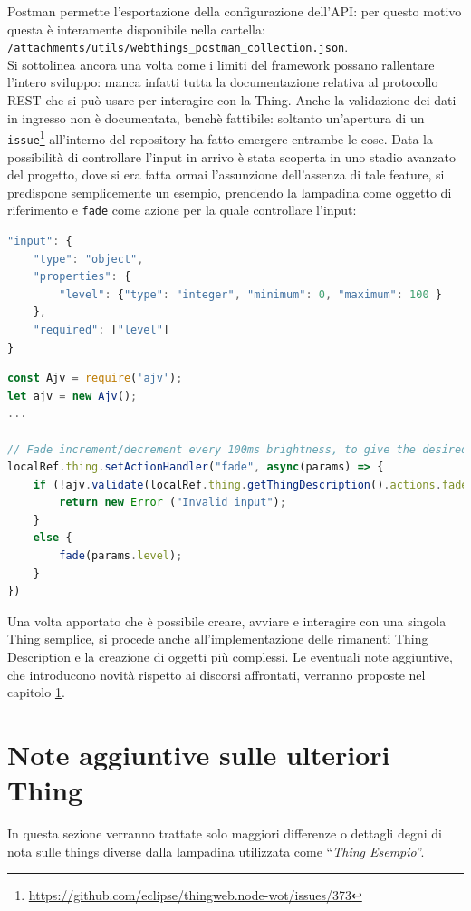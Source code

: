 \documentclass[12pt,a4paper,openright,oneside]{report}
\newcommand{\quotes}[1]{``#1''}
\begin{document}
Postman permette l'esportazione della configurazione dell'API: per questo motivo questa è interamente disponibile nella cartella:\\ \texttt{/attachments/utils/webthings\_postman\_collection.json}.\\

Si sottolinea ancora una volta come i limiti del framework possano rallentare l'intero sviluppo: manca infatti tutta la documentazione relativa al protocollo REST che si può usare per interagire con la Thing. Anche la validazione dei dati in ingresso non è documentata, benchè fattibile: soltanto un'apertura di un \texttt{issue}\footnote{\url{https://github.com/eclipse/thingweb.node-wot/issues/373}} all'interno del repository ha fatto emergere entrambe le cose. Data la possibilità di controllare l'input in arrivo è stata scoperta in uno stadio avanzato del progetto, dove si era fatta ormai l'assunzione dell'assenza di tale feature, si predispone semplicemente un esempio, prendendo la lampadina come oggetto di riferimento e \texttt{fade} come azione per la quale controllare l'input:

\begin{lstlisting}[language=JavaScript]
"input": {
	"type": "object",
	"properties": {
		"level": {"type": "integer", "minimum": 0, "maximum": 100 }
	},
	"required": ["level"]
}
\end{lstlisting}

\begin{lstlisting}[language=JavaScript]
const Ajv = require('ajv');
let ajv = new Ajv();
...

// Fade increment/decrement every 100ms brightness, to give the desired value
localRef.thing.setActionHandler("fade", async(params) => {
	if (!ajv.validate(localRef.thing.getThingDescription().actions.fade.input, params)) {
		return new Error ("Invalid input");
	}
	else {
		fade(params.level);
	}
})
\end{lstlisting}


Una volta apportato che è possibile creare, avviare e interagire con una singola Thing semplice, si procede anche all'implementazione delle rimanenti Thing Description e la creazione di oggetti più complessi. Le eventuali note aggiuntive, che introducono novità rispetto ai discorsi affrontati, verranno proposte nel capitolo \ref{sec:other-things}.


\section{Note aggiuntive sulle ulteriori Thing}
\label{sec:other-things}
In questa sezione verranno trattate solo maggiori differenze o dettagli degni di nota sulle things diverse dalla lampadina utilizzata come \quotes{\textit{Thing Esempio}}.
\end{document}
